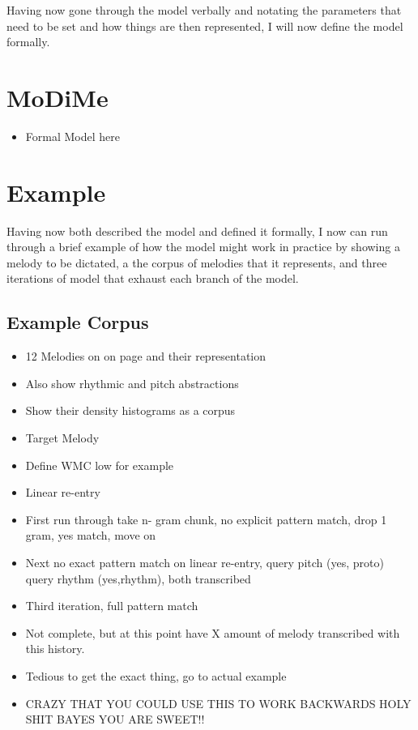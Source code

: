 \documentclass[]{book}
\providecommand{\tightlist}{%
  \setlength{\itemsep}{0pt}\setlength{\parskip}{0pt}}
\theoremstyle{definition}
\theoremstyle{definition}
\theoremstyle{definition}
\theoremstyle{remark}
\begin{document}
Having now gone through the model verbally and notating the parameters
that need to be set and how things are then represented, I will now
define the model formally.

\hypertarget{modime}{%
\section{MoDiMe}\label{modime}}

\begin{itemize}
\tightlist
\item
  Formal Model here
\end{itemize}

\hypertarget{example}{%
\section{Example}\label{example}}

Having now both described the model and defined it formally, I now can
run through a brief example of how the model might work in practice by
showing a melody to be dictated, a the corpus of melodies that it
represents, and three iterations of model that exhaust each branch of
the model.

\hypertarget{example-corpus}{%
\subsection{Example Corpus}\label{example-corpus}}

\begin{itemize}
\item
  12 Melodies on on page and their representation
\item
  Also show rhythmic and pitch abstractions
\item
  Show their density histograms as a corpus
\item
  Target Melody
\item
  Define WMC low for example
\item
  Linear re-entry
\item
  First run through take n- gram chunk, no explicit pattern match, drop
  1 gram, yes match, move on
\item
  Next no exact pattern match on linear re-entry, query pitch (yes,
  proto) query rhythm (yes,rhythm), both transcribed
\item
  Third iteration, full pattern match
\item
  Not complete, but at this point have X amount of melody transcribed
  with this history.
\item
  Tedious to get the exact thing, go to actual example
\item
  CRAZY THAT YOU COULD USE THIS TO WORK BACKWARDS HOLY SHIT BAYES YOU
  ARE SWEET!!
\end{itemize}
\end{document}

